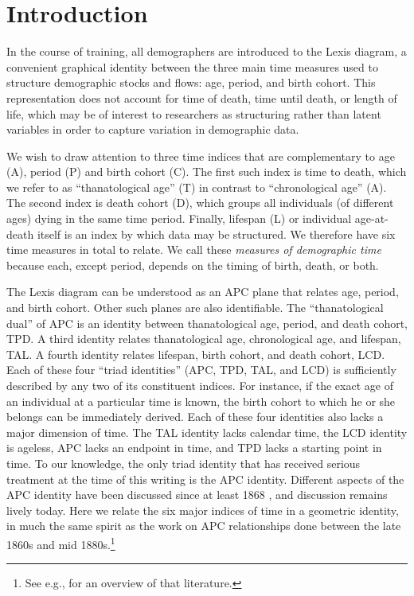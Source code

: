 \documentclass[12pt,oneside,a4paper]{article} %
\theoremstyle{definition}
\begin{document}

\section{Introduction}
In the course of training, all demographers are introduced
to the Lexis diagram, a convenient graphical identity between the three main
time measures used to structure demographic stocks and flows: age, period, and
birth cohort. This representation does not account for time of death, time until
death, or length of life, which may be of interest to researchers as structuring rather than latent variables in order to capture
variation in demographic data. 

We wish to draw attention to three time indices that are complementary to age
(A), period (P) and birth cohort (C). The first such index is time to death,
which we refer to as ``thanatological age'' (T) in contrast to ``chronological
age'' (A). The second index is death cohort (D), which groups all individuals
(of different ages) dying in the same time period. Finally, lifespan (L) or
individual age-at-death itself is an index by which data may be structured.
We therefore have six time measures in total to relate. We call these \emph{measures of demographic
time} because each, except period, depends on the timing of birth, death, or
both.

The Lexis diagram can be understood as an APC plane
that relates age, period, and birth cohort. Other such planes are
also identifiable.
The ``thanatological dual'' of APC is an identity between thanatological
age, period, and death cohort, TPD. A third identity relates thanatological age,
chronological age, and lifespan, TAL. A fourth identity relates lifespan, birth
cohort, and death cohort, LCD. Each of these four ``triad identities'' (APC, TPD, TAL, and LCD) is sufficiently
described by any two of its constituent indices. For instance, if the exact age of an individual at a particular
time is known, the birth cohort to which he or she belongs can be immediately derived. Each of these four identities also lacks a major dimension of time. The TAL identity lacks calendar time, the LCD identity is ageless, APC lacks an endpoint in time, and TPD lacks a starting point in time.
To our knowledge, the only triad identity that has received serious
treatment at the time of this writing is the APC identity. Different
aspects of the APC identity have been discussed since at least 1868
\citep{knapp1868ermittlung}, and discussion remains lively today. Here we relate the six major indices of time in a geometric identity, in much the same spirit as the work on APC relationships done between the late
1860s and mid 1880s.\footnote{See e.g., \citet{keiding2011age} for an overview of that literature.} 
\end{document}
